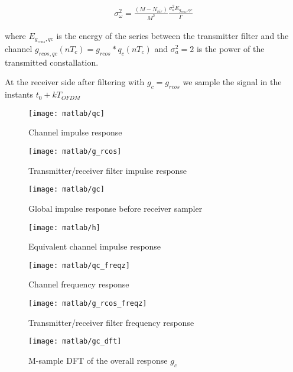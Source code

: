 \documentclass[a4paper,oneside]{article}
\begin{document}
\begin{align*}
\sigma_{\omega}^2 = \frac{(M-N_{vir})}{M^2}\frac{\sigma_{a}^2 E_{g_{rcos},qc}}{\Gamma}
\end{align*}

where $E_{g_{rcos},qc}$ is the energy of the series between the transmitter filter and the channel $g_{rcos,qc}(nT_c) = g_{rcos}*q_c(nT_c)$ and $\sigma_a^2 = 2$ is the power of the transmitted constallation.

At the receiver side after filtering with $g_c = g_{rcos}$ we sample the signal in the instants $t_0 + kT_{OFDM}$

\begin{figure}[htbp]
  \centering
  \texttt{[image: matlab/qc]}
  \caption{Channel impulse response}
  \label{plot:qc}
\end{figure}

\begin{figure}[htbp]
  \centering
  \texttt{[image: matlab/g\_rcos]}
  \caption{Transmitter/receiver filter impulse response}
  \label{plot:g_rcos}
\end{figure}

\begin{figure}[htbp]
  \centering
  \texttt{[image: matlab/gc]}
  \caption{Global impulse response before receiver sampler}
  \label{plot:gc}
\end{figure}

\begin{figure}[htbp]
  \centering
  \texttt{[image: matlab/h]}
  \caption{Equivalent channel impulse response}
  \label{plot:h}
\end{figure}


\begin{figure}[htbp]
  \centering
  \texttt{[image: matlab/qc\_freqz]}
  \caption{Channel frequency response}
  \label{plot:qc_freqz}
\end{figure}

\begin{figure}[htbp]
  \centering
  \texttt{[image: matlab/g\_rcos\_freqz]}
  \caption{Transmitter/receiver filter frequency response}
  \label{plot:g_rcos_freqz}
\end{figure}

\begin{figure}[htbp]
  \centering
  \texttt{[image: matlab/gc\_dft]}
  \caption{M-sample DFT of the overall response $g_c$}
  \label{plot:gc_dft}
\end{figure}
\end{document}

